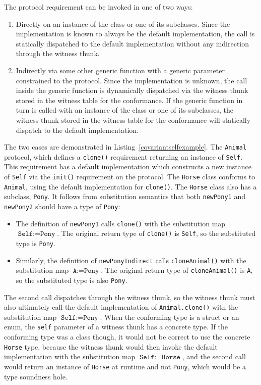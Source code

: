 \documentclass[a4paper,headsepline,bibliography=totoc,toc=flat,fleqn,twoside=semi]{scrbook}
\theoremstyle{definition}
\theoremstyle{definition}
\theoremstyle{definition}
\begin{document}
The protocol requirement can be invoked in one of two ways:
\begin{enumerate}
\item Directly on an instance of the class or one of its subclasses. Since the implementation is known to always be the default implementation, the call is statically dispatched to the default implementation without any indirection through the witness thunk.
\item Indirectly via some other generic function with a generic parameter constrained to the protocol. Since the implementation is unknown, the call inside the generic function is dynamically dispatched via the witness thunk stored in the witness table for the conformance. If the generic function in turn is called with an instance of the class or one of its subclasses, the witness thunk stored in the witness table for the conformance will statically dispatch to the default implementation.
\end{enumerate}
The two cases are demonstrated in Listing~\ref{covariantselfexample}. The \texttt{Animal} protocol, which defines a \texttt{clone()} requirement returning an instance of \texttt{Self}. This requirement has a default implementation which constructs a new instance of \texttt{Self} via the \texttt{init()} requirement on the protocol. The \texttt{Horse} class conforms to \texttt{Animal}, using the default implementation for \texttt{clone()}. The \texttt{Horse} class also has a subclass, \texttt{Pony}. It follows from substitution semantics that both \texttt{newPony1} and \texttt{newPony2} should have a type of \texttt{Pony}:
\begin{itemize}
\item The definition of \texttt{newPony1} calls \texttt{clone()} with the substitution map $\texttt{Self} := \texttt{Pony}$. The original return type of \texttt{clone()} is \texttt{Self}, so the substituted type is \texttt{Pony}.
\item Similarly, the definition of \texttt{newPonyIndirect} calls \texttt{cloneAnimal()} with the substitution map $\texttt{A} := \texttt{Pony}$. The original return type of \texttt{cloneAnimal()} is \texttt{A}, so the substituted type is also \texttt{Pony}.
\end{itemize}
The second call dispatches through the witness thunk, so the witness thunk must also ultimately call the default implementation of \texttt{Animal.clone()} with the substitution map $\texttt{Self} := \texttt{Pony}$. When the conforming type is a struct or an enum, the \texttt{self} parameter of a witness thunk has a concrete type. If the conforming type was a class though, it would not be correct to use the concrete \texttt{Horse} type, because the witness thunk would then invoke the default implementation with the substitution map $\texttt{Self} := \texttt{Horse}$, and the second call would return an instance of \texttt{Horse} at runtime and not \texttt{Pony}, which would be a type soundness hole.
\end{document}
